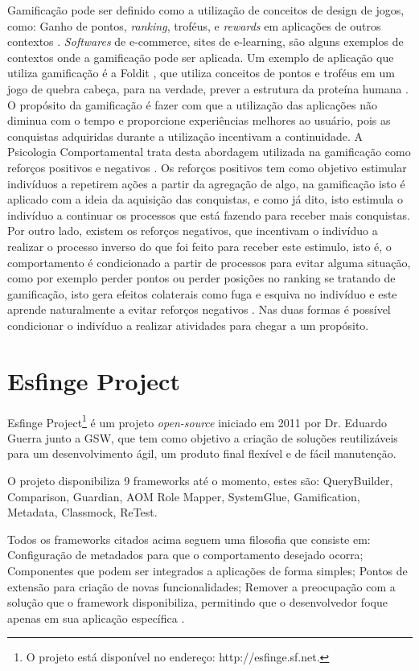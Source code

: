 \par Gamificação pode ser definido como a utilização de conceitos de design de jogos, como: Ganho de pontos, \textit{ranking}, troféus, e \textit{rewards} em aplicações de outros contextos \cite{deterding2011gamification}. \textit{Softwares} de e-commerce, sites de e-learning, são alguns exemplos de contextos onde a gamificação pode ser aplicada. Um exemplo de aplicação que utiliza gamificação é a Foldit \cite{burke2012behind}, que utiliza conceitos de pontos e troféus em um jogo de quebra cabeça, para na verdade, prever a estrutura da proteína humana \cite{deterding2011gamification}. O propósito da gamificação é fazer com que a utilização das aplicações não diminua com o tempo e proporcione experiências melhores ao usuário, pois as conquistas adquiridas durante a utilização incentivam a continuidade. A Psicologia Comportamental trata desta abordagem utilizada na gamificação como reforços positivos e negativos \cite{skinner1990behavior}. Os reforços positivos tem como objetivo estimular indivíduos a repetirem ações a partir da agregação de algo, na gamificação isto é aplicado com a ideia da aquisição das conquistas, e como já dito, isto estimula o indivíduo a continuar os processos que está fazendo para receber mais conquistas. Por outro lado, existem os reforços negativos, que incentivam o indivíduo a realizar o processo inverso do que foi feito para receber este estimulo, isto é, o comportamento é condicionado a partir de processos para evitar alguma situação, como por exemplo perder pontos ou perder posições no ranking se tratando de gamificação, isto gera efeitos colaterais como fuga e esquiva no indivíduo e este aprende naturalmente a evitar reforços negativos \cite{linehan2015gamification}. Nas duas formas é possível condicionar o indivíduo a realizar atividades para chegar a um propósito.

\section{Esfinge Project}

\par Esfinge Project\footnote{O projeto está disponível no endereço: http://esfinge.sf.net.} é um projeto \textit{open-source} iniciado em 2011 por Dr. Eduardo Guerra junto a GSW, que tem como objetivo a criação de soluções reutilizáveis para um desenvolvimento ágil, um produto final flexível e de fácil manutenção.
\par O projeto disponibiliza 9 frameworks até o momento, estes são: QueryBuilder, Comparison, Guardian, AOM Role Mapper, SystemGlue, Gamification, Metadata, Classmock, ReTest.
\par Todos os frameworks citados acima seguem uma filosofia que consiste em: Configuração de metadados para que o comportamento desejado ocorra; Componentes que podem ser integrados a aplicações de forma simples; Pontos de extensão para criação de novas funcionalidades; Remover a preocupação com a solução que o framework disponibiliza, permitindo que o desenvolvedor foque apenas em sua aplicação específica .

